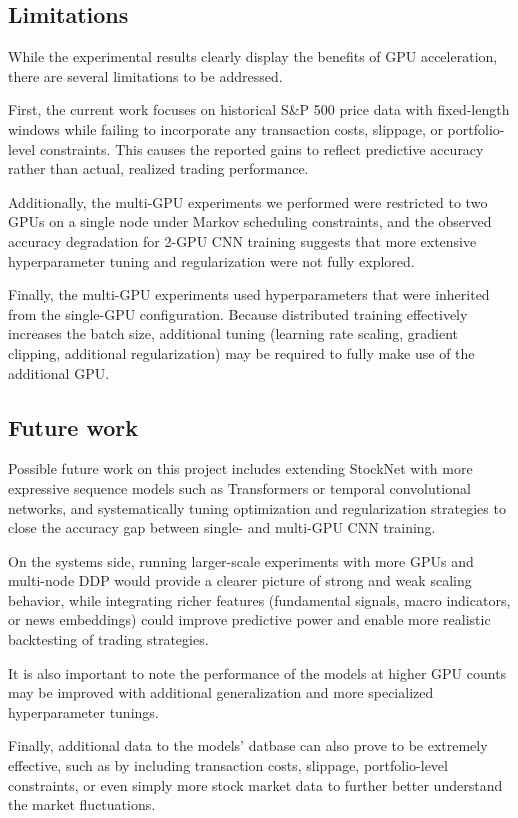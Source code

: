 \documentclass[sigconf]{acmart}
\begin{document}
\subsection{Limitations}

While the experimental results clearly display the benefits of GPU acceleration, there are several limitations to be addressed.

First, the current work focuses on historical S\&P 500 price data with fixed-length windows while failing to incorporate any transaction costs, slippage, or portfolio-level constraints. This causes the reported gains to reflect predictive accuracy rather than actual, realized trading performance. 

Additionally, the multi-GPU experiments we performed were restricted to two GPUs on a single node under Markov scheduling constraints, and the observed accuracy degradation for 2-GPU CNN training suggests that more extensive hyperparameter tuning and regularization were not fully explored. 

Finally, the multi-GPU experiments used hyperparameters that were inherited from the single-GPU configuration. Because distributed training effectively increases the batch size, additional tuning (learning rate scaling, gradient clipping, additional regularization) may be required to fully make use of the additional GPU. 

\subsection{Future work}

Possible future work on this project includes extending StockNet with more expressive sequence models such as Transformers or temporal convolutional networks, and systematically tuning optimization and regularization strategies to close the accuracy gap between single- and multi-GPU CNN training. 

On the systems side, running larger-scale experiments with more GPUs and multi-node DDP would provide a clearer picture of strong and weak scaling behavior, while integrating richer features (fundamental signals, macro indicators, or news embeddings) could improve predictive power and enable more realistic backtesting of trading strategies.

It is also important to note the performance of the models  at higher GPU counts may be improved with additional generalization and more specialized hyperparameter tunings.

Finally, additional data to the models’ datbase can also prove to be extremely effective, such as by including transaction costs, slippage, portfolio-level constraints, or even simply more stock market data to further better understand the market fluctuations.
\end{document}

